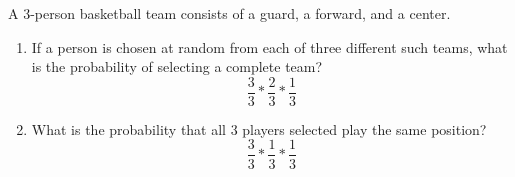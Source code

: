 \item A 3-person basketball team consists of a guard, a forward, and a center.
\begin{enumerate}
    \item If a person is chosen at random from each of three different such teams, what is the probability of selecting a complete team?
    \[ \frac{3}{3} * \frac{2}{3} * \frac{1}{3} \]
    \item What is the probability that all 3 players selected play the same position?
    \[ \frac{3}{3} * \frac{1}{3} * \frac{1}{3} \]
\end{enumerate}